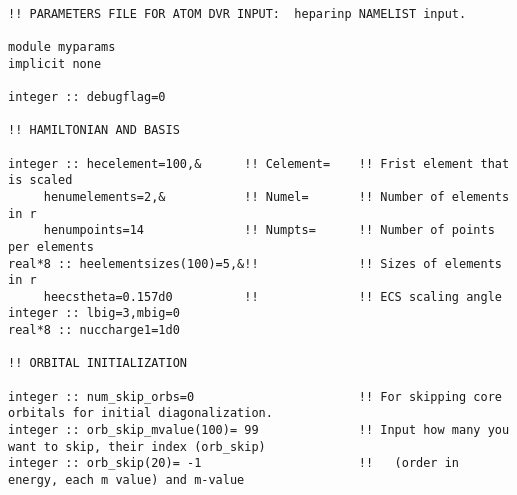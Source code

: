 \begin{verbatim}

!! PARAMETERS FILE FOR ATOM DVR INPUT:  heparinp NAMELIST input.

module myparams
implicit none

integer :: debugflag=0

!! HAMILTONIAN AND BASIS

integer :: hecelement=100,&      !! Celement=    !! Frist element that is scaled
     henumelements=2,&           !! Numel=       !! Number of elements in r
     henumpoints=14              !! Numpts=      !! Number of points per elements 
real*8 :: heelementsizes(100)=5,&!!              !! Sizes of elements in r
     heecstheta=0.157d0          !!              !! ECS scaling angle
integer :: lbig=3,mbig=0
real*8 :: nuccharge1=1d0

!! ORBITAL INITIALIZATION

integer :: num_skip_orbs=0                       !! For skipping core orbitals for initial diagonalization.
integer :: orb_skip_mvalue(100)= 99              !! Input how many you want to skip, their index (orb_skip)
integer :: orb_skip(20)= -1                      !!   (order in energy, each m value) and m-value

\end{verbatim}
